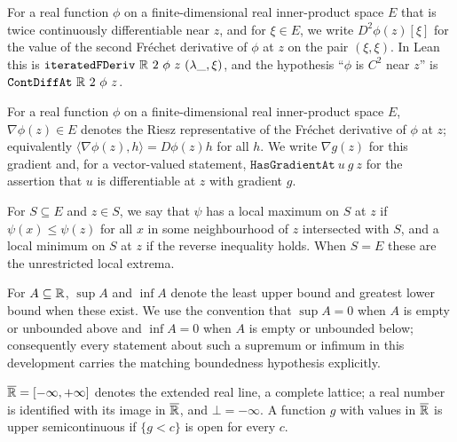 \begin{definition}
For a real function $\phi$ on a finite-dimensional real inner-product space $E$
that is twice continuously differentiable near $z$, and for $\xi\in E$, we write
$D^2\phi(z)[\xi]$ for the value of the second Fr\'echet derivative of $\phi$ at
$z$ on the pair $(\xi,\xi)$. In Lean this is
$\texttt{iteratedFDeriv}\ \R\ 2\ \phi\ z\ (\lambda\_,\xi)$, and the hypothesis
``$\phi$ is $C^2$ near $z$'' is $\texttt{ContDiffAt}\ \R\ 2\ \phi\ z$.
\end{definition}

\begin{definition}[Gradient]
For a real function $\phi$ on a finite-dimensional real inner-product space $E$,
$\nabla\phi(z)\in E$ denotes the Riesz representative of the Fr\'echet derivative
of $\phi$ at $z$; equivalently $\langle\nabla\phi(z),h\rangle=D\phi(z)h$ for all
$h$. We write $\nabla g(z)$ for this gradient and, for a vector-valued statement,
$\texttt{HasGradientAt}\ u\ g\ z$ for the assertion that $u$ is differentiable at
$z$ with gradient $g$.
\end{definition}

\begin{definition}
For $S\subseteq E$ and $z\in S$, we say that $\psi$ has a local maximum on $S$ at
$z$ if $\psi(x)\le\psi(z)$ for all $x$ in some neighbourhood of $z$ intersected
with $S$, and a local minimum on $S$ at $z$ if the reverse inequality holds.
When $S=E$ these are the unrestricted local extrema.
\end{definition}

\begin{definition}
For $A\subseteq\mathbb{R}$, $\sup A$ and $\inf A$ denote the least upper bound and
greatest lower bound when these exist. We use the convention that $\sup A=0$
when $A$ is empty or unbounded above and $\inf A=0$ when $A$ is empty or
unbounded below; consequently every statement about such a supremum or infimum
in this development carries the matching boundedness hypothesis explicitly.
\end{definition}

\begin{definition}
$\overline{\mathbb{R}}=[-\infty,+\infty]$ denotes the extended real line, a complete
lattice; a real number is identified with its image in $\overline{\mathbb{R}}$, and
$\bot=-\infty$. A function $g$ with values in $\overline{\mathbb{R}}$ is upper
semicontinuous if $\{g<c\}$ is open for every $c$.
\end{definition}

